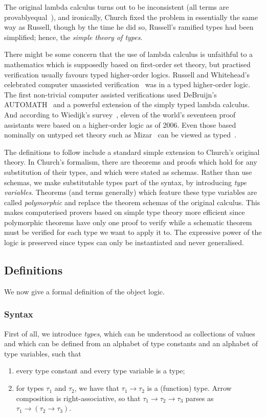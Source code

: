 The original lambda calculus turns out to be inconsistent (all terms are provably\linebreak equal~\cite{InconsistencyLambdaCalculus}), and ironically, Church fixed the problem in essentially the same way as Russell, though by the time he did so, Russell's ramified types had been simplified; hence, the \emph{simple theory of types}.

There might be some concern that the use of lambda calculus is unfaithful to a mathematics which is supposedly based on first-order set theory, but practised verification usually favours typed higher-order logics. Russell and Whitehead's celebrated computer unassisted verification~\cite{Principia} was in a typed higher-order logic. The first non-trivial computer assisted verifications used DeBruijn's AUTOMATH~\cite{AUTOMATH} and a powerful extension of the simply typed lambda calculus. And according to Wiedijk's survey~\cite{SeventeenProvers}, eleven of the world's seventeen proof assistants were based on a higher-order logic as of 2006. Even those based nominally on untyped set theory such as Mizar~\cite{MizarMathematicalVernacular} can be viewed as typed~\cite{MizarSoftTypes}.

The definitions to follow include a standard simple extension to Church's original theory. In Church's formalism, there are theorems and proofs which hold for any substitution of their types, and which were stated as schemas. Rather than use schemas, we make substitutable types part of the syntax, by introducing \emph{type variables}. Theorems (and terms generally) which feature these type variables are called \emph{polymorphic} and replace the theorem schemas of the original calculus. This makes computerised provers based on simple type theory more efficient since polymorphic theorems have only one proof to verify while a schematic theorem must be verified for each type we want to apply it to. The expressive power of the logic is preserved since types can only be instantiated and never generalised.

\subsection{Definitions}\label{sec:ObjectLogicFormal}
We now give a formal definition of the object logic.

\subsubsection{Syntax}
First of all, we introduce \emph{types}, which can be understood as collections of values and which can be defined from an alphabet of type constants and an alphabet of type variables, such that
\begin{enumerate}
\item every type constant and every type variable is a type;
\item for types $\tau_1$ and $\tau_2$, we have that $\tau_1 \rightarrow \tau_2$ is a (function) type. Arrow composition is right-associative, so that $\tau_1 \rightarrow \tau_2 \rightarrow \tau_3$ parses as $\tau_1 \rightarrow (\tau_2 \rightarrow \tau_3)$.
\end{enumerate}


